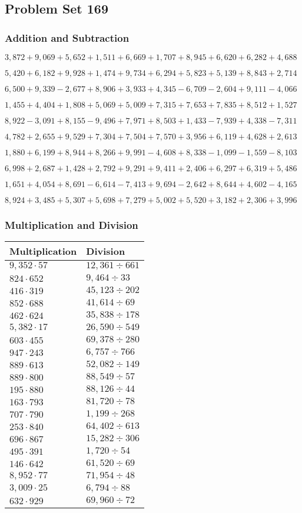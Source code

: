 \hypertarget{problem-set-169}{%
\subsection{Problem Set 169}\label{problem-set-169}}

\hypertarget{addition-and-subtraction}{%
\subsubsection{Addition and
Subtraction}\label{addition-and-subtraction}}

\(3,872+9,069+5,652+1,511+6,669+1,707+8,945+6,620+6,282+4,688\)

\(5,420+6,182+9,928+1,474+9,734+6,294+5,823+5,139+8,843+2,714\)

\(6,500+9,339-2,677+8,906+3,933+4,345-6,709-2,604+9,111-4,066\)

\(1,455+4,404+1,808+5,069+5,009+7,315+7,653+7,835+8,512+1,527\)

\(8,922-3,091+8,155-9,496+7,971+8,503+1,433-7,939+4,338-7,311\)

\(4,782+2,655+9,529+7,304+7,504+7,570+3,956+6,119+4,628+2,613\)

\(1,880+6,199+8,944+8,266+9,991-4,608+8,338-1,099-1,559-8,103\)

\(6,998+2,687+1,428+2,792+9,291+9,411+2,406+6,297+6,319+5,486\)

\(1,651+4,054+8,691-6,614-7,413+9,694-2,642+8,644+4,602-4,165\)

\(8,924+3,485+5,307+5,698+7,279+5,002+5,520+3,182+2,306+3,996\)

\hypertarget{multiplication-and-division}{%
\subsubsection{Multiplication and
Division}\label{multiplication-and-division}}

\begin{longtable}[]{@{}ll@{}}
\toprule
Multiplication & Division\tabularnewline
\midrule
\endhead
\(9,352\cdot57\) & \(12,361÷661\)\tabularnewline
\(824\cdot652\) & \(9,464÷33\)\tabularnewline
\(416\cdot319\) & \(45,123÷202\)\tabularnewline
\(852\cdot688\) & \(41,614÷69\)\tabularnewline
\(462\cdot624\) & \(35,838÷178\)\tabularnewline
\(5,382\cdot17\) & \(26,590÷549\)\tabularnewline
\(603\cdot455\) & \(69,378÷280\)\tabularnewline
\(947\cdot243\) & \(6,757÷766\)\tabularnewline
\(889\cdot613\) & \(52,082÷149\)\tabularnewline
\(889\cdot800\) & \(88,549÷57\)\tabularnewline
\(195\cdot880\) & \(88,126÷44\)\tabularnewline
\(163\cdot793\) & \(81,720÷78\)\tabularnewline
\(707\cdot790\) & \(1,199÷268\)\tabularnewline
\(253\cdot840\) & \(64,402÷613\)\tabularnewline
\(696\cdot867\) & \(15,282÷306\)\tabularnewline
\(495\cdot391\) & \(1,720÷54\)\tabularnewline
\(146\cdot642\) & \(61,520÷69\)\tabularnewline
\(8,952\cdot77\) & \(71,954÷48\)\tabularnewline
\(3,009\cdot25\) & \(6,794÷88\)\tabularnewline
\(632\cdot929\) & \(69,960÷72\)\tabularnewline
\bottomrule
\end{longtable}
